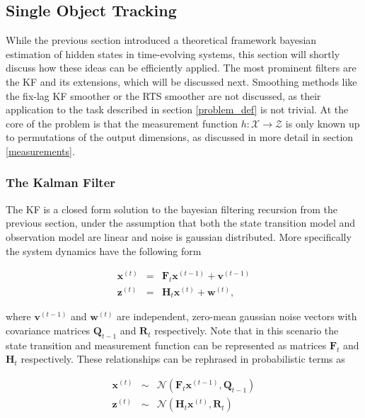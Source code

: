 \documentclass[12pt,a4paper]{article}
\begin{document}
\subsection{Single Object Tracking}

While the previous section introduced a theoretical framework bayesian estimation of hidden states in time-evolving systems, this section will shortly discuss how these ideas can be efficiently applied. The most prominent filters are the KF and its extensions, which will be discussed next. Smoothing methods like the fix-lag KF smoother or the RTS smoother are not discussed, as their application to the task described in section \ref{problem_def} is not trivial. At the core of the problem is that the measurement function $h: \mathcal{X} \rightarrow \mathcal{Z}$ is only known up to permutations of the output dimensions, as discussed in more detail in section \ref{measurements}.

\subsubsection{The Kalman Filter}
The KF is a closed form solution to the bayesian filtering recursion from the previous section, under the assumption that both the state transition model and observation model are linear and noise is gaussian distributed. More specifically the system dynamics have the following form

\begin{eqnarray}
\mathbf{x}^{(t)} &=& \mathbf{F}_t \mathbf{x}^{(t-1)} + \mathbf{v}^{(t-1)} \\
\mathbf{z}^{(t)} &=& \mathbf{H}_t \mathbf{x}^{(t)} + \mathbf{w}^{(t)},
\end{eqnarray}

where $\mathbf{v}^{(t-1)}$ and $\mathbf{w}^{(t)}$ are independent, zero-mean gaussian noise vectors with covariance matrices $\mathbf{Q}_{t-1}$ and $\mathbf{R}_t$ respectively. Note that in this scenario the state transition and measurement function can be represented as matrices $\mathbf{F}_t$ and $\mathbf{H}_t$ respectively.
These relationships can be rephrased in probabilistic terms as

\begin{eqnarray}
\mathbf{x}^{(t)} &\sim& \mathcal{N}\left( \mathbf{F}_t \mathbf{x}^{(t-1)}, \mathbf{Q}_{t-1} \right) \\
\mathbf{z}^{(t)} &\sim& \mathcal{N}\left( \mathbf{H}_t \mathbf{x}^{(t)}, \mathbf{R}_{t} \right)
\end{eqnarray}
\end{document}

